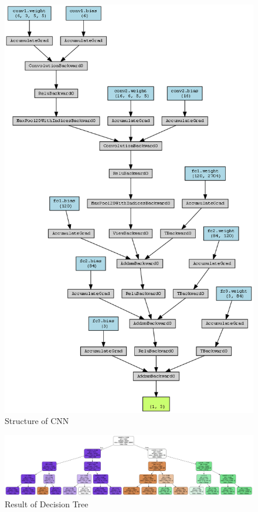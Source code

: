 \documentclass[
  11pt,
]{article}
\begin{document}
\begin{figure}
\centering
\begin{minipage}{0.45\textwidth}
\centering
\includegraphics[width=\linewidth]{./data/simple_cnn_visualization.png}
\caption{Structure of CNN}
\label{fig:cnn}
\end{minipage}
\end{figure}

\begin{figure}
\centering
\begin{minipage}{\textwidth}
\centering
\includegraphics[width=\linewidth]{./images/decision_tree.png}
\caption{Result of Decision Tree}
\label{fig:res_dt}
\end{minipage}
\end{figure}
\end{document}
